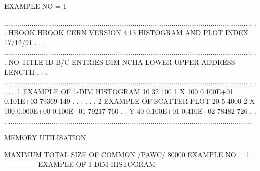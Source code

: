 \begin{Listing}
 EXAMPLE NO = 1
 
 .............................................................................................................................
 .                                                                                                                           .
 .   HBOOK   HBOOK  CERN            VERSION   4.13       HISTOGRAM AND PLOT INDEX                             17/12/91       .
 .                                                                                                                           .
 .............................................................................................................................
 .                                                                                                                           .
 .  NO                     TITLE                      ID  B/C  ENTRIES DIM   NCHA     LOWER       UPPER       ADDRESS LENGTH .
 .                                                                                                                           .
 .............................................................................................................................
 .                                                                                                                           .
 .                                                                                                                           .
 .   1  EXAMPLE OF 1-DIM HISTOGRAM                    10  32      100  1  X   100   0.100E+01   0.101E+03       79369    149 .
 .                                                                                                                           .
 .                                                                                                                           .
 .   2  EXAMPLE OF SCATTER-PLOT                       20   5     4000  2  X   100   0.000E+00   0.100E+01       79217    760 .
 .                                                                        Y    40   0.100E+01   0.410E+02       78482    726 .
 .                                                                                                                           .
 .............................................................................................................................

 MEMORY UTILISATION

      MAXIMUM TOTAL SIZE OF COMMON /PAWC/            80000
\newpage\setlength{\baselineskip}{5.7pt}\relax
 EXAMPLE NO = 1                                                                  
 --------------                                                                  
 EXAMPLE OF 1-DIM HISTOGRAM                                                      
 

\end{Listing}
